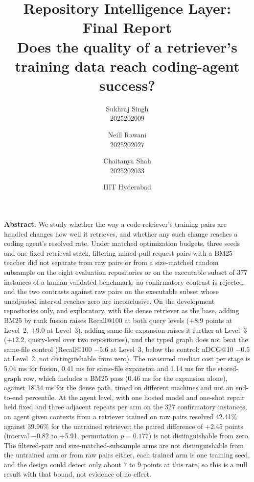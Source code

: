 \documentclass[10pt,twocolumn]{article}
\title{\vspace{-0.65in}\textbf{Repository Intelligence Layer: Final Report}\\[2pt]
\large Does the quality of a retriever's training data reach coding-agent success?}
\author{Sukhraj Singh\\ \small 2025202009 \and Neill Rawani\\ \small 2025202027 \and
Chaitanya Shah\\ \small 2025202033}
\date{\vspace{-6pt}IIIT Hyderabad}
\begin{document}
\maketitle
\vspace{-0.4in}

\noindent\textbf{Abstract.} We study whether the way a code retriever's training pairs are handled changes how well it retrieves, and whether any such change reaches a coding agent's resolved rate.
Under matched optimization budgets, three seeds and one fixed retrieval stack, filtering mined pull-request pairs with a BM25 teacher did not separate from raw pairs or from a size-matched random subsample on the eight evaluation repositories or on the executable subset of 377 instances of a human-validated benchmark: no confirmatory contrast is rejected, and
the two contrasts against raw pairs on the executable subset whose unadjusted interval reaches zero are inconclusive. %
On the development repositories only, and exploratory, with the dense retriever as the base, adding BM25 by rank fusion raises Recall@100 at both query levels ($+8.9$ points at Level~2, $+9.0$ at Level~3), adding same-file expansion raises it further at Level~3 ($+12.2$, query-level over two repositories), and the typed graph does not beat the same-file control (Recall@100 $-5.6$ at Level~3, below the control; nDCG@10 $-0.5$ at Level~2, not distinguishable from zero). %
The measured median cost per stage is 5.04 ms for fusion, 0.41 ms for same-file expansion and 1.14 ms for the stored-graph row, which includes a BM25 pass (0.46 ms for the expansion alone), against 18.34 ms for the dense path, timed on different machines and not an end-to-end percentile. %
At the agent level, with one hosted model and one-shot repair held fixed and three adjacent repeats per arm on the 327 confirmatory instances, an agent given contexts from a retriever trained on raw pairs resolved 42.41\% against 39.96\% for the untrained retriever; the paired difference of +2.45 points (interval $-$0.82 to +5.91, permutation $p=0.177$) is not distinguishable from zero. %
The filtered-pair and size-matched-subsample arms are not distinguishable from the untrained arm or from raw pairs either, each trained arm is one training seed, and the design could detect only about 7 to 9 points at this rate, so this is a null result with that bound, not evidence of no effect. %
\end{document}
